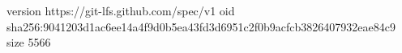 version https://git-lfs.github.com/spec/v1
oid sha256:9041203d1ac6ee14a4f9d0b5ea43fd3d6951c2f0b9acfcb3826407932eae84c9
size 5566
